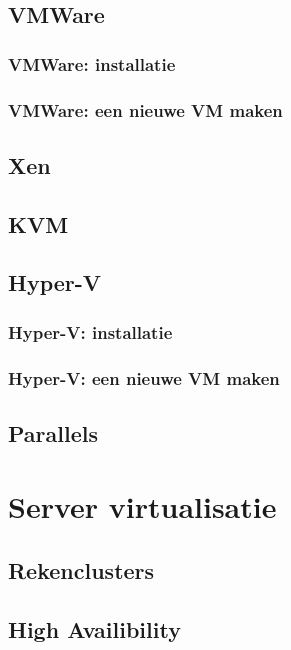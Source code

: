 \documentclass[a4paper,12pt,twoside,openright,titlepage]{book}
\begin{document}
\subsection{VMWare}

\subsubsection{VMWare: installatie}

\subsubsection{VMWare: een nieuwe VM maken}

\subsection{Xen}

\subsection{KVM}

\subsection{Hyper-V}

\subsubsection{Hyper-V: installatie}

\subsubsection{Hyper-V: een nieuwe VM maken}

\subsection{Parallels}

\section{Server virtualisatie}

\subsection{Rekenclusters}

\subsection{High Availibility}

\end{document}
